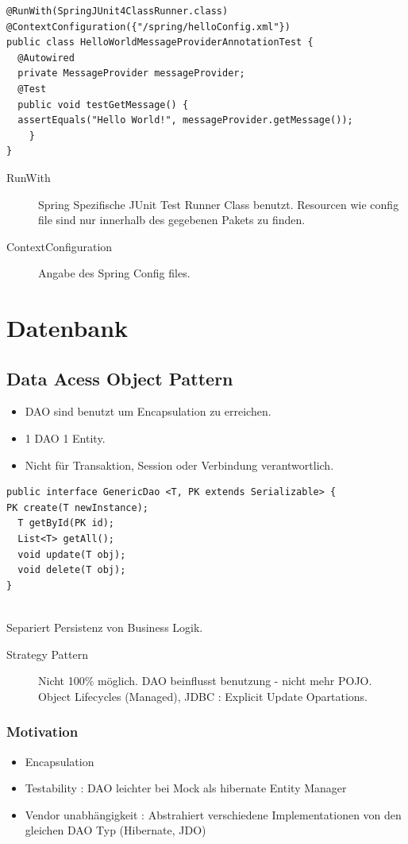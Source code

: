\documentclass[a4paper,10pt]{scrreprt}
\begin{document}
\begin{lstlisting}[caption=Testing Example]
@RunWith(SpringJUnit4ClassRunner.class)
@ContextConfiguration({"/spring/helloConfig.xml"})
public class HelloWorldMessageProviderAnnotationTest {
  @Autowired
  private MessageProvider messageProvider;
  @Test
  public void testGetMessage() {
  assertEquals("Hello World!", messageProvider.getMessage());
    }
}
\end{lstlisting}
\begin{description}
 \item [RunWith] Spring Spezifische JUnit Test Runner Class benutzt. Resourcen wie config file sind nur innerhalb des gegebenen Pakets zu finden.
 \item [ContextConfiguration] Angabe des Spring Config files.
\end{description}

\chapter{Datenbank}

\section{Data Acess Object Pattern}
\begin{itemize}
 \item DAO sind benutzt um Encapsulation zu erreichen.
 \item 1 DAO 1 Entity.
 \item Nicht für Transaktion, Session oder Verbindung verantwortlich.
 
\end{itemize}

\begin{lstlisting}[caption=GenericDAO]
public interface GenericDao <T, PK extends Serializable> {
PK create(T newInstance);
  T getById(PK id);
  List<T> getAll();
  void update(T obj);
  void delete(T obj);
}
 
\end{lstlisting}

Separiert Persistenz von Business Logik.
\begin{description}
 \item [Strategy Pattern] Nicht 100\% möglich. DAO beinflusst benutzung - nicht mehr POJO. Object Lifecycles (Managed), JDBC : Explicit Update Opartations.
\end{description}

\subsection{Motivation}
\begin{itemize}
 \item Encapsulation
 \item Testability : DAO leichter bei Mock als hibernate Entity Manager
 \item Vendor unabhängigkeit : Abstrahiert verschiedene Implementationen von den gleichen DAO Typ (Hibernate, JDO) 
\end{itemize}
\end{document}
